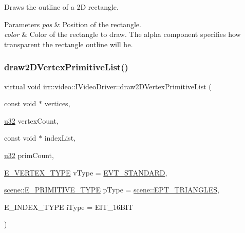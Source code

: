 Draws the outline of a 2D rectangle. 


\begin{DoxyParams}{Parameters}
{\em pos} & Position of the rectangle. \\
\hline
{\em color} & Color of the rectangle to draw. The alpha component specifies how transparent the rectangle outline will be. \\
\hline
\end{DoxyParams}
\mbox{\label{classirr_1_1video_1_1IVideoDriver_a34845920167c68578a78f842af54d140}} 
\subsubsection{\texorpdfstring{draw2\+D\+Vertex\+Primitive\+List()}{draw2DVertexPrimitiveList()}}
{\footnotesize\ttfamily virtual void irr\+::video\+::\+I\+Video\+Driver\+::draw2\+D\+Vertex\+Primitive\+List (\begin{DoxyParamCaption}\item[{const void $\ast$}]{vertices,  }\item[{\hyperlink{namespaceirr_a0416a53257075833e7002efd0a18e804}{u32}}]{vertex\+Count,  }\item[{const void $\ast$}]{index\+List,  }\item[{\hyperlink{namespaceirr_a0416a53257075833e7002efd0a18e804}{u32}}]{prim\+Count,  }\item[{\hyperlink{namespaceirr_1_1video_a0e3b59e025e0d0db0ed2ee0ce904deac}{E\+\_\+\+V\+E\+R\+T\+E\+X\+\_\+\+T\+Y\+PE}}]{v\+Type = {\ttfamily \hyperlink{namespaceirr_1_1video_a0e3b59e025e0d0db0ed2ee0ce904deaca98c8b791280bbf9252c4f4a37e91a416}{E\+V\+T\+\_\+\+S\+T\+A\+N\+D\+A\+RD}},  }\item[{\hyperlink{namespaceirr_1_1scene_a5d7de82f2169761194b2f44d95cdc1dc}{scene\+::\+E\+\_\+\+P\+R\+I\+M\+I\+T\+I\+V\+E\+\_\+\+T\+Y\+PE}}]{p\+Type = {\ttfamily \hyperlink{namespaceirr_1_1scene_a5d7de82f2169761194b2f44d95cdc1dca237fc76e4b259febd27b4b84066ca581}{scene\+::\+E\+P\+T\+\_\+\+T\+R\+I\+A\+N\+G\+L\+ES}},  }\item[{E\+\_\+\+I\+N\+D\+E\+X\+\_\+\+T\+Y\+PE}]{i\+Type = {\ttfamily EIT\+\_\+16BIT} }\end{DoxyParamCaption})\hspace{0.3cm}{\ttfamily [pure virtual]}}



